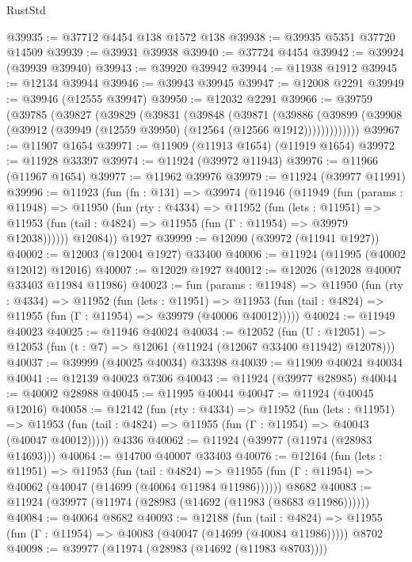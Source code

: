\begin{lexlean}{RustStd}
\begin{coremodule}
@39935 := @37712 @4454 @138 @1572 @138
@39938 := @39935 @5351 @37720 @14509
@39939 := @39931 @39938
@39940 := @37724 @4454
@39942 := @39924 (@39939 @39940)
@39943 := @39920 @39942
@39944 := @11938 @1912
@39945 := @12134 @39944
@39946 := @39943 @39945
@39947 := @12008 @2291
@39949 := @39946 (@12555 @39947)
@39950 := @12032 @2291
@39966 := @39759
    (@39785
      (@39827
        (@39829
          (@39831
            (@39848
              (@39871
                (@39886
                  (@39899 (@39908 (@39912 (@39949 (@12559 @39950) (@12564 (@12566 @1912)))))))))))))
@39967 := @11907 @1654
@39971 := @11909 (@11913 @1654) (@11919 @1654)
@39972 := @11928 @33397
@39974 := @11924 (@39972 @11943)
@39976 := @11966 (@11967 @1654)
@39977 := @11962 @39976
@39979 := @11924 (@39977 @11991)
@39996 := @11923
    (fun (fn : @131) =>
    @39974
      (@11946
        (@11949
          (fun (params : @11948) =>
          @11950
            (fun (rty : @4334) =>
            @11952
              (fun (lets : @11951) =>
              @11953 (fun (tail : @4824) => @11955 (fun (Γ : @11954) => @39979 @12038))))))
        @12084))
    @1927
@39999 := @12090 (@39972 (@11941 @1927))
@40002 := @12003 (@12004 @1927) @33400
@40006 := @11924 (@11995 (@40002 @12012) @12016)
@40007 := @12029 @1927
@40012 := @12026 (@12028 @40007 @33403 @11984 @11986)
@40023 := fun (params : @11948) =>
  @11950
    (fun (rty : @4334) =>
    @11952
      (fun (lets : @11951) =>
      @11953 (fun (tail : @4824) => @11955 (fun (Γ : @11954) => @39979 (@40006 @40012)))))
@40024 := @11949 @40023
@40025 := @11946 @40024
@40034 := @12052
    (fun (U : @12051) => @12053 (fun (t : @7) => @12061 (@11924 (@12067 @33400 @11942) @12078)))
@40037 := @39999 (@40025 @40034) @33398
@40039 := @11909 @40024 @40034
@40041 := @12139 @40023 @7306
@40043 := @11924 (@39977 @28985)
@40044 := @40002 @28988
@40045 := @11995 @40044
@40047 := @11924 (@40045 @12016)
@40058 := @12142
    (fun (rty : @4334) =>
    @11952
      (fun (lets : @11951) =>
      @11953 (fun (tail : @4824) => @11955 (fun (Γ : @11954) => @40043 (@40047 @40012)))))
    @4336
@40062 := @11924 (@39977 (@11974 (@28983 @14693)))
@40064 := @14700 @40007 @33403
@40076 := @12164
    (fun (lets : @11951) =>
    @11953
      (fun (tail : @4824) =>
      @11955 (fun (Γ : @11954) => @40062 (@40047 (@14699 (@40064 @11984 @11986))))))
    @8682
@40083 := @11924 (@39977 (@11974 (@28983 (@14692 (@11983 (@8683 @11986))))))
@40084 := @40064 @8682
@40093 := @12188
    (fun (tail : @4824) => @11955 (fun (Γ : @11954) => @40083 (@40047 (@14699 (@40084 @11986)))))
    @8702
@40098 := @39977 (@11974 (@28983 (@14692 (@11983 @8703))))

\end{coremodule}
\end{lexlean}
